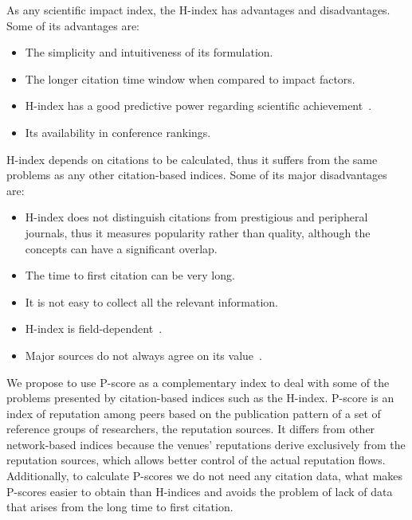 \documentclass[notitlepage]{svjour3}
\begin{document}
As any scientific impact index, the H-index has advantages and disadvantages. 
Some of its advantages are:

\begin{itemize}
\item The simplicity and intuitiveness of its formulation.
\item The longer citation time window when compared to impact factors.
\item H-index has a good predictive power regarding scientific achievement~\cite{Bornmann2005,Hirsch2007}.
\item Its availability in conference rankings.
\end{itemize}

H-index depends on citations to be calculated, thus it suffers from the 
same problems as any other citation-based indices. Some of its major disadvantages are:

\begin{itemize}
\item H-index does not distinguish citations from prestigious and peripheral journals, thus 
it measures popularity rather than quality, although the concepts can have a significant overlap.
\item The time to first citation can be very long.
\item It is not easy to collect all the relevant information.
\item H-index is field-dependent~\cite{Wendl2007}.
\item Major sources do not always agree on its value~\cite{Bar-Ilan2008}. 
\end{itemize}

We propose to use P-score as a complementary index to deal with some of the problems
presented by citation-based indices such as the H-index.
P-score is an index of reputation among peers based on the publication pattern of a set of
reference groups of researchers, the reputation sources. It differs from other network-based 
indices because the venues' reputations derive exclusively from the reputation sources, which 
allows better control of the actual reputation flows. Additionally, to calculate P-scores we 
do not need any citation data, what makes P-scores easier to obtain than H-indices and avoids 
the problem of lack of data that arises from the long time to first citation.
\end{document}
